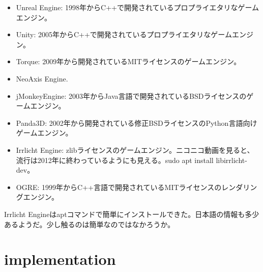 \documentclass[uplatex,dvipdfmx]{jsarticle} \usepackage{amsmath,amssymb,bm}
\begin{document}
\begin{itemize}
\item Unreal Engine: 1998年からC++で開発されているプロプライエタリなゲームエンジン。
\item Unity: 2005年からC++で開発されているプロプライエタリなゲームエンジン。
\item Torque: 2009年から開発されているMITライセンスのゲームエンジン。
\item NeoAxis Engine.
\item jMonkeyEngine: 2003年からJava言語で開発されているBSDライセンスのゲームエンジン。
\item Panda3D: 2002年から開発されている修正BSDライセンスのPython言語向けゲームエンジン。
\item Irrlicht Engine: zlibライセンスのゲームエンジン。ニコニコ動画を見ると、流行は2012年に終わっているようにも見える。sudo apt install libirrlicht-dev。
\item OGRE: 1999年からC++言語で開発されているMITライセンスのレンダリングエンジン。
\end{itemize}

Irrlicht Engineはaptコマンドで簡単にインストールできた。日本語の情報も多少あるようだ。少し触るのは簡単なのではなかろうか。


\section*{implementation}



\vspace{\baselineskip}
\begin{paracol}{2}
\switchcolumn
\end{paracol}
\end{document}
